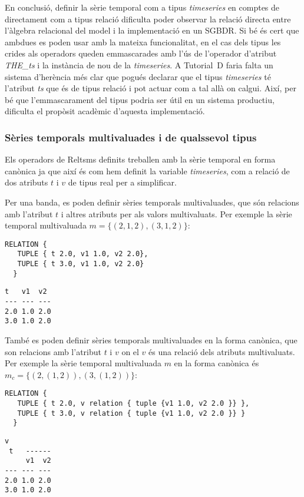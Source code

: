 En conclusió, definir la sèrie temporal com a tipus \emph{timeseries}
en comptes de directament com a tipus relació dificulta poder observar
la relació directa entre l'àlgebra relacional del model i la
implementació en un \gls{SGBDR}. Si bé és cert que ambdues es poden
usar amb la mateixa funcionalitat, en el cas dels tipus les crides als
operadors queden emmascarades amb l'ús de l'operador d'atribut
\emph{THE\_ts} i la instància de nou de la \emph{timeseries}.  A
Tutorial~D faria falta un sistema d'herència més clar que pogués
declarar que el tipus \emph{timeseries} té l'atribut \emph{ts} que és
de tipus relació i pot actuar com a tal allà on calgui. Així, per bé
que l'emmascarament del tipus podria ser útil en un sistema productiu,
dificulta el propòsit acadèmic d'aquesta implementació.


\subsubsection{Sèries temporals multivaluades i de qualssevol tipus}



Els operadors de Reltsms definits treballen amb la sèrie temporal en
forma canònica ja que així és com hem definit la variable
\emph{timeseries}, com a relació de dos atributs $t$ i $v$ de tipus
real per a simplificar.

Per una banda, es poden definir sèries temporals multivaluades, que
són relacions amb l'atribut $t$ i altres atributs per als valors
multivaluats. Per exemple la sèrie temporal multivaluada $m = \{
(2,1,2),(3,1,2) \}$:
\begin{lstlisting}[style=tutorialD]
 RELATION {
   TUPLE { t 2.0, v1 1.0, v2 2.0},
   TUPLE { t 3.0, v1 1.0, v2 2.0}
  }
\end{lstlisting}
\begin{lstlisting}[style=stdout]
 t   v1  v2
--- --- ---
2.0 1.0 2.0
3.0 1.0 2.0
\end{lstlisting}

També es poden definir sèries temporals multivaluades en la forma
canònica, que son relacions amb l'atribut $t$ i $v$ on el $v$ és una
relació dels atributs multivaluats. Per exemple la sèrie temporal
multivaluada $m$ en la forma canònica és $m_c = \{ (2,(1,2)),(3,(1,2))
\}$:
\begin{lstlisting}[style=tutorialD]
 RELATION {
   TUPLE { t 2.0, v relation { tuple {v1 1.0, v2 2.0 }} },
   TUPLE { t 3.0, v relation { tuple {v1 1.0, v2 2.0 }} }
  }
\end{lstlisting}
\begin{lstlisting}[style=stdout]
        v
 t   ------
     v1  v2
--- --- ---
2.0 1.0 2.0
3.0 1.0 2.0
\end{lstlisting}


